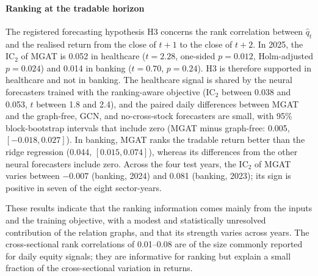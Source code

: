 \documentclass[pdflatex,sn-mathphys-num]{sn-jnl}%
\theoremstyle{thmstyleone}%
\theoremstyle{thmstyletwo}%
\theoremstyle{thmstylethree}%
\begin{document}
{\paragraph{Ranking at the tradable horizon}
The registered forecasting hypothesis H3 concerns the rank correlation between $\hat q_t$ and the realised return from the close of $t+1$ to the close of $t+2$. In 2025, the IC$_2$ of MGAT is 0.052 in healthcare ($t=2.28$, one-sided $p=0.012$, Holm-adjusted $p=0.024$) and 0.014 in banking ($t=0.70$, $p=0.24$). H3 is therefore supported in healthcare and not in banking. The healthcare signal is shared by the neural forecasters trained with the ranking-aware objective (IC$_2$ between 0.038 and 0.053, $t$ between 1.8 and 2.4), and the paired daily differences between MGAT and the graph-free, GCN, and no-cross-stock forecasters are small, with 95\% block-bootstrap intervals that include zero (MGAT minus graph-free: 0.005, $[-0.018, 0.027]$). In banking, MGAT ranks the tradable return better than the ridge regression (0.044, $[0.015, 0.074]$), whereas its differences from the other neural forecasters include zero. Across the four test years, the IC$_2$ of MGAT varies between $-0.007$ (banking, 2024) and 0.081 (banking, 2023); its sign is positive in seven of the eight sector-years.

These results indicate that the ranking information comes mainly from the inputs and the training objective, with a modest and statistically unresolved contribution of the relation graphs, and that its strength varies across years. The cross-sectional rank correlations of 0.01--0.08 are of the size commonly reported for daily equity signals; they are informative for ranking but explain a small fraction of the cross-sectional variation in returns.\par}
\end{document}
